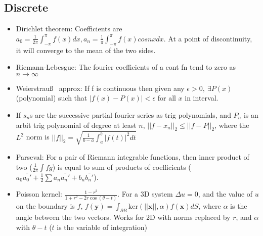 \documentclass[12pt]{article}
\begin{document}
\subsection*{Discrete}
\begin{itemize}
\item Dirichlet theorem: Coefficients are $a_0=\frac1{2\pi} \int_{-\pi}^\pi f(x)dx, a_n=\frac1{\pi} \int_{-\pi}^\pi f(x)cos nx dx$. At a point of discontinuity, it will converge to the mean of the two sides.
\item Riemann-Lebesgue: The fourier coefficients of a cont fn tend to zero as $n\to\infty$
\item Weierstrau\ss~ approx: If f is continuous then given any $\epsilon>0,~\exists P(x)$ (polynomial) such that $|f(x)-P(x)|< \epsilon$ for all $x$ in interval.
\item If $s_n$s are the successive partial fourier series as trig polynomials, and $P_n$ is an arbit trig polynomial of degree at least $n$, $||f-x_n||_2\leq ||f-P||_2$, where the $L^2$ norm is $||f||_2=\sqrt{\frac1{b-a}\int_a^b |f(t)|^2 dt}$
\item Parseval: For a pair of Riemann integrable functions, then inner product of two ($\frac{1}{2\pi}\int f\bar{g}$) 
is equal to sum of products of coefficients ($a_0\bar{a_0'}+\frac12\sum a_n\bar{a_n'} + b_n\bar{b_n'}$).
\item Poisson kernel: $\frac{1-r^2}{1+r^2-2r\cos(\theta-t)}$. For a 3D system $\Delta u=0$, and the value of $u$ on the boundary is $f$, $f(\mathbf y)=\int_{\partial B} \mathrm{ker}(||\mathbf x||,\alpha) f(\mathbf x) dS$, where $\alpha$ is the angle between the two vectors. Works for 2D with norms replaced by $r$, and $\alpha$ with $\theta-t$ ($t$ is the variable of integration)

\end{itemize}
\end{document}
